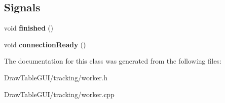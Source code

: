\subsection*{Signals}
\begin{DoxyCompactItemize}
\item 
\hypertarget{classWorker_adfa119799838e68b671be5947a367f4a}{}void {\bfseries finished} ()\label{classWorker_adfa119799838e68b671be5947a367f4a}

\item 
\hypertarget{classWorker_ae4c9e6f21fd756d04025b76e0224b48f}{}void {\bfseries connection\+Ready} ()\label{classWorker_ae4c9e6f21fd756d04025b76e0224b48f}

\end{DoxyCompactItemize}


The documentation for this class was generated from the following files\+:\begin{DoxyCompactItemize}
\item 
Draw\+Table\+G\+U\+I/tracking/worker.\+h\item 
Draw\+Table\+G\+U\+I/tracking/worker.\+cpp\end{DoxyCompactItemize}
